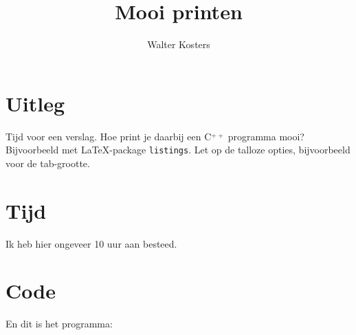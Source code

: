 \documentclass[10pt]{article}
\title{Mooi printen}
\author{Walter Kosters}
\begin{document}

\maketitle

\section{Uitleg}
Tijd voor een verslag.
Hoe print je daarbij een C$\stackrel{++}{}$ programma mooi?
Bijvoorbeeld met \LaTeX-package \verb+listings+.
Let op de talloze opties, bijvoorbeeld voor de tab-grootte.

\section{Tijd}
Ik heb hier ongeveer 10 uur aan besteed.

\section*{Code}
En dit is het programma:

\end{document}
